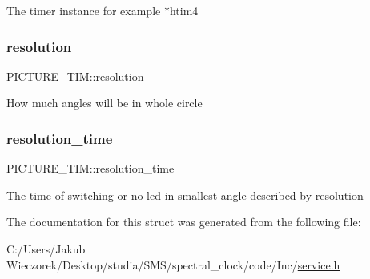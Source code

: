 The timer instance for example $\ast$htim4 \mbox{\label{struct_p_i_c_t_u_r_e___t_i_m_a3d06b455814460a24c468ebcd99d3816}} 
\subsubsection{\texorpdfstring{resolution}{resolution}}
{\footnotesize\ttfamily P\+I\+C\+T\+U\+R\+E\+\_\+\+T\+I\+M\+::resolution}

How much angles will be in whole circle \mbox{\label{struct_p_i_c_t_u_r_e___t_i_m_ae44652306b65f37915c24a4c344733b5}} 
\subsubsection{\texorpdfstring{resolution\+\_\+time}{resolution\_time}}
{\footnotesize\ttfamily P\+I\+C\+T\+U\+R\+E\+\_\+\+T\+I\+M\+::resolution\+\_\+time}

The time of switching or no led in smallest angle described by resolution 

The documentation for this struct was generated from the following file\+:\begin{DoxyCompactItemize}
\item 
C\+:/\+Users/\+Jakub Wieczorek/\+Desktop/studia/\+S\+M\+S/spectral\+\_\+clock/code/\+Inc/\mbox{\hyperlink{service_8h}{service.\+h}}\end{DoxyCompactItemize}
